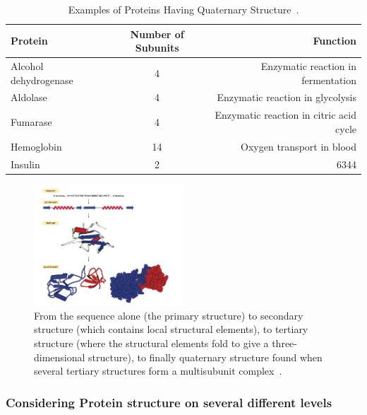 \documentclass{report}
\begin{document}
\begin{table}[h!]
    \begin{center}
    \label{tab:Quanternanry Protiens}
        \begin{tabular}{l|c|r}
            \hline
            Protein & Number of Subunits & Function\\
            \hline
            Alcohol dehydrogenase & 4 & Enzymatic reaction in fermentation\\ 
            \hline
            Aldolase & 4 & Enzymatic reaction in glycolysis\\
            \hline
            Fumarase & 4 & Enzymatic reaction in citric acid cycle \\
            \hline
            Hemoglobin & 14 & Oxygen transport in blood\\
            \hline
            Insulin & 2 & 6344\\
            \hline
        \end{tabular}
        \caption{\label{Quanternanry Protiens}Examples of Proteins Having Quaternary Structure~\cite{ouellette_14_2015}.}
    \end{center}
\end{table}


\begin{figure}[H]
    \centering
    \includegraphics[width=0.5\textwidth]{Protein Structure.png}
    \caption{\label{fig:Simple schematic showing the different levels of protein structure.}From the sequence alone (the primary structure) to secondary structure (which contains local structural elements), to tertiary structure (where the structural elements fold to give a three-dimensional structure), to finally quaternary structure found when several tertiary structures form a multisubunit complex~\cite{zvelebil_understanding_2008}.}
\end{figure}

\subsubsection{Considering Protein structure on several different levels}
\end{document}
